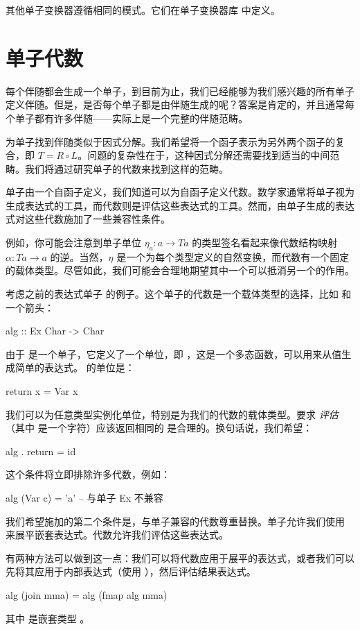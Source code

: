 \documentclass[DaoFP]{subfiles}
\begin{document}
其他单子变换器遵循相同的模式。它们在单子变换器库  中定义。

\section{单子代数}

每个伴随都会生成一个单子，到目前为止，我们已经能够为我们感兴趣的所有单子定义伴随。但是，是否每个单子都是由伴随生成的呢？答案是肯定的，并且通常每个单子都有许多伴随——实际上是一个完整的伴随范畴。

为单子找到伴随类似于因式分解。我们希望将一个函子表示为另外两个函子的复合，即 $T = R \circ L$。问题的复杂性在于，这种因式分解还需要找到适当的中间范畴。我们将通过研究单子的代数来找到这样的范畴。

单子由一个自函子定义，我们知道可以为自函子定义代数。数学家通常将单子视为生成表达式的工具，而代数则是评估这些表达式的工具。然而，由单子生成的表达式对这些代数施加了一些兼容性条件。

例如，你可能会注意到单子单位 $\eta_a \colon a \to T a$ 的类型签名看起来像代数结构映射 $\alpha \colon T a \to a$ 的逆。当然，$\eta$ 是一个为每个类型定义的自然变换，而代数有一个固定的载体类型。尽管如此，我们可能会合理地期望其中一个可以抵消另一个的作用。

考虑之前的表达式单子  的例子。这个单子的代数是一个载体类型的选择，比如  和一个箭头：
\begin{haskell}
alg :: Ex Char -> Char
\end{haskell}
由于  是一个单子，它定义了一个单位，即 ，这是一个多态函数，可以用来从值生成简单的表达式。 的单位是：
\begin{haskell}
return x = Var x
\end{haskell}
我们可以为任意类型实例化单位，特别是为我们的代数的载体类型。要求 \emph{评估} （其中  是一个字符）应该返回相同的  是合理的。换句话说，我们希望：
\begin{haskell}
 alg . return = id
\end{haskell}
这个条件将立即排除许多代数，例如：
\begin{haskell}
alg (Var c) = 'a' -- 与单子 Ex 不兼容
\end{haskell}

我们希望施加的第二个条件是，与单子兼容的代数尊重替换。单子允许我们使用  来展平嵌套表达式。代数允许我们评估这些表达式。

有两种方法可以做到这一点：我们可以将代数应用于展平的表达式，或者我们可以先将其应用于内部表达式（使用 ），然后评估结果表达式。
\begin{haskell}
 alg (join mma) = alg (fmap alg mma)
\end{haskell}
其中  是嵌套类型 。
\end{document}
